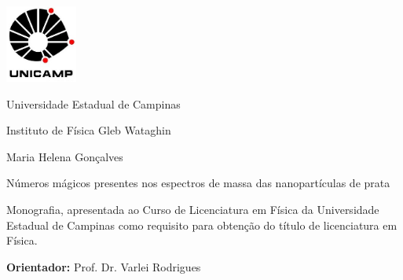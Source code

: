 \pagestyle{plain}
\vspace{-5cm}
\includegraphics[width=.94\textwidth, height=1in,
keepaspectratio=true]{logos/logo_Unicamp}

\begin{center}
{\Large {\sc Universidade Estadual de Campinas \\}

Instituto de Física  Gleb Wataghin \\
\vspace{0.5cm}
}
{\Large {\Large Maria Helena Gonçalves}\\
}

\vspace{3.5cm}
{\huge Números mágicos presentes
\vspace{0.4cm}
nos espectros de massa das nanopartículas de prata}

\vspace{2.5cm}

\end{center}

\begin{flushright}
  \begin{minipage}[c]{.5\textwidth}
        Monografia, apresentada ao Curso de Licenciatura em Física da Universidade Estadual de Campinas como requisito para obtenção do título de licenciatura em Física.
        
        \vspace{.2cm}
        \textbf{Orientador:} Prof. Dr. Varlei Rodrigues
    
  \end{minipage}
\end{flushright}

\begin{center}



\vspace{1cm}







\end{center}

\vspace{1cm}

\begin{center}

 \\
 \\

\end{center}


